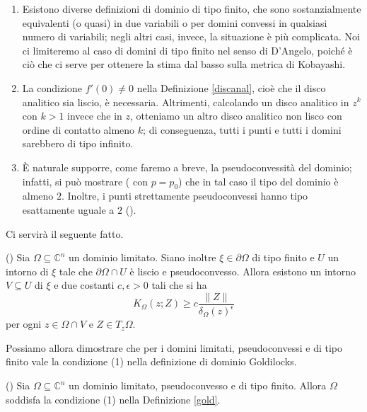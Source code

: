 \begin{oss}
    \begin{enumerate}
        \item Esistono diverse definizioni di dominio di tipo finito, che sono sostanzialmente equivalenti (o quasi) in due variabili o per domini convessi in qualsiasi numero di variabili; negli altri casi, invece, la situazione è più complicata. Noi ci limiteremo al caso di domini di tipo finito nel senso di D'Angelo, poiché è ciò che ci serve per ottenere la stima dal basso sulla metrica di Kobayashi.
        \item La condizione $f'(0)\not=0$ nella Definizione \ref{discanal}, cioè che il disco analitico sia liscio, è necessaria. Altrimenti, calcolando un disco analitico in $z^k$ con $k>1$ invece che in $z$, otteniamo un altro disco analitico non lisco con ordine di contatto almeno $k$; di conseguenza, tutti i punti e tutti i domini sarebbero di tipo infinito.
        \item È naturale supporre, come faremo a breve, la pseudoconvessità del dominio; infatti, si può mostrare (\cite[Corollary 5.6]{D'A} con $p=p_0$) che in tal caso il tipo del dominio è almeno $2$. Inoltre, i punti strettamente pseudoconvessi hanno tipo esattamente uguale a $2$ (\cite[Corollary 5.8]{D'A}).
    \end{enumerate}
\end{oss}

Ci servirà il seguente fatto.

\begin{thm} \label{cho}
    (\cite[Theorem 1]{Ch}) Sia $\Omega\subseteq\mathbb{C}^n$ un dominio limitato. Siano inoltre $\xi\in\partial\Omega$ di tipo finito e $U$ un intorno di $\xi$ tale che $\partial\Omega\cap U$ è liscio e pseudoconvesso. Allora esistono un intorno $V\subseteq U$ di $\xi$ e due costanti $c,\epsilon>0$ tali che si ha
    $$K_\Omega(z;Z) \ge c\frac{\|Z\|}{\delta_\Omega(z)^\epsilon}$$
    per ogni $z\in\Omega\cap V$ e $Z\in T_z\Omega$.
\end{thm}

Possiamo allora dimostrare che per i domini limitati, pseudoconvessi e di tipo finito vale la condizione (1) nella definizione di dominio Goldilocks.

\begin{cor} \label{finito_is_1}
    (\cite[Lemma 2.6]{BZ1}) Sia $\Omega\subseteq\mathbb{C}^n$ un dominio limitato, pseudoconvesso e di tipo finito. Allora $\Omega$ soddisfa la condizione (1) nella Definizione \ref{gold}.
\end{cor}


